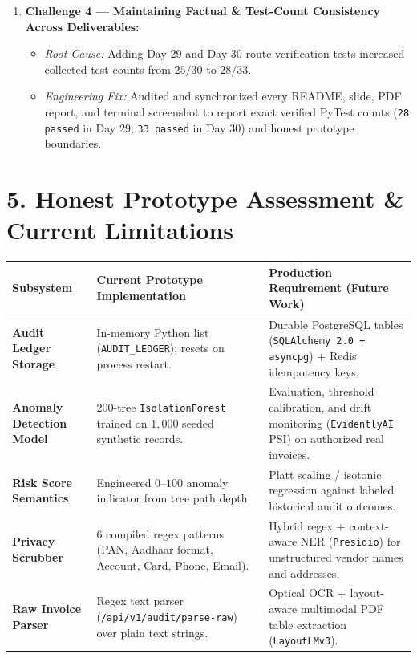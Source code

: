 \documentclass[a4paper,10pt]{article}
\begin{document}
\begin{enumerate}[leftmargin=0.22in, itemsep=4pt]
\begin{itemize}[leftmargin=0.18in, itemsep=1pt]
    \end{itemize}
    \item \textbf{Challenge 4 --- Maintaining Factual & Test-Count Consistency Across Deliverables:}
    \begin{itemize}[leftmargin=0.18in, itemsep=1pt]
        \item \textit{Root Cause:} Adding Day 29 and Day 30 route verification tests increased collected test counts from $25/30$ to $28/33$.
        \item \textit{Engineering Fix:} Audited and synchronized every README, slide, PDF report, and terminal screenshot to report exact verified PyTest counts (\texttt{28 passed} in Day 29; \texttt{33 passed} in Day 30) and honest prototype boundaries.
    \end{itemize}
\end{enumerate}

\section{5. Honest Prototype Assessment \& Current Limitations}
\begin{tabularx}{\textwidth}{@{}p{1.65in}p{1.85in}X@{}}
\toprule
\textbf{Subsystem} & \textbf{Current Prototype Implementation} & \textbf{Production Requirement (Future Work)} \\
\midrule
\textbf{Audit Ledger Storage} & In-memory Python list (\texttt{AUDIT\_LEDGER}); resets on process restart. & Durable PostgreSQL tables (\texttt{SQLAlchemy 2.0 + asyncpg}) + Redis idempotency keys. \\
\addlinespace[3pt]
\textbf{Anomaly Detection Model} & 200-tree \texttt{IsolationForest} trained on $1{,}000$ seeded synthetic records. & Evaluation, threshold calibration, and drift monitoring (\texttt{EvidentlyAI} PSI) on authorized real invoices. \\
\addlinespace[3pt]
\textbf{Risk Score Semantics} & Engineered $0\text{--}100$ anomaly indicator from tree path depth. & Platt scaling / isotonic regression against labeled historical audit outcomes. \\
\addlinespace[3pt]
\textbf{Privacy Scrubber} & 6 compiled regex patterns (PAN, Aadhaar format, Account, Card, Phone, Email). & Hybrid regex + context-aware NER (\texttt{Presidio}) for unstructured vendor names and addresses. \\
\addlinespace[3pt]
\textbf{Raw Invoice Parser} & Regex text parser (\texttt{/api/v1/audit/parse-raw}) over plain text strings. & Optical OCR + layout-aware multimodal PDF table extraction (\texttt{LayoutLMv3}). \\
\bottomrule
\end{tabularx}
\end{document}
